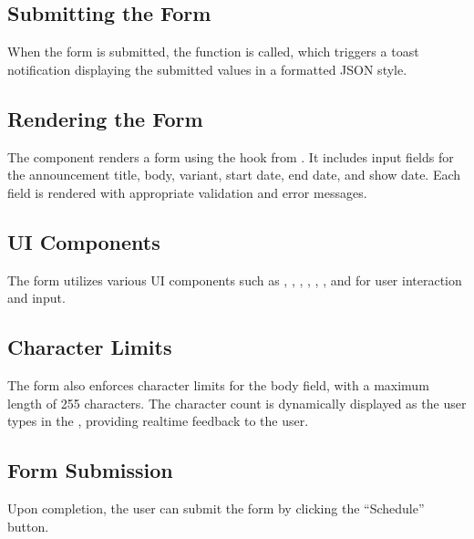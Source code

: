 \documentclass[letterpaper,10pt,english]{sphinxmanual}
\begin{document}
\subsection{Submitting the Form}
\label{\detokenize{forms/announcement:submitting-the-form}}
\sphinxAtStartPar
When the form is submitted, the  function is called, which triggers a toast notification displaying the submitted values in a formatted JSON style.


\subsection{Rendering the Form}
\label{\detokenize{forms/announcement:rendering-the-form}}
\sphinxAtStartPar
The  component renders a form using the  hook from . It includes input fields for the announcement title, body, variant, start date, end date, and show date. Each field is rendered with appropriate validation and error messages.


\subsection{UI Components}
\label{\detokenize{forms/announcement:ui-components}}
\sphinxAtStartPar
The form utilizes various UI components such as , , , , , , and  for user interaction and input.


\subsection{Character Limits}
\label{\detokenize{forms/announcement:character-limits}}
\sphinxAtStartPar
The form also enforces character limits for the body field, with a maximum length of 255 characters. The character count is dynamically displayed as the user types in the , providing real\sphinxhyphen{}time feedback to the user.


\subsection{Form Submission}
\label{\detokenize{forms/announcement:form-submission}}
\sphinxAtStartPar
Upon completion, the user can submit the form by clicking the “Schedule” button.
\end{document}
